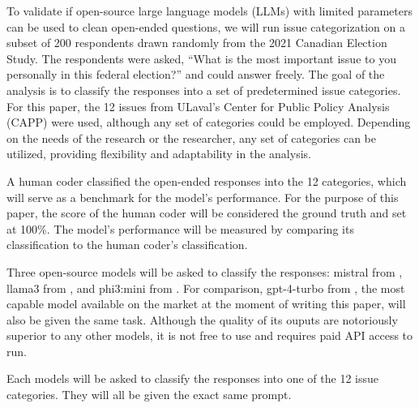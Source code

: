 \documentclass[
  authoryear,
  preprint,
  3p]{elsarticle}
\newenvironment{Shaded}{\begin{snugshade}}{\end{snugshade}}
\newcommand{\FunctionTok}[1]{\textcolor[rgb]{0.28,0.35,0.67}{#1}}
\newcommand{\NormalTok}[1]{\textcolor[rgb]{0.00,0.23,0.31}{#1}}
\newcommand{\OtherTok}[1]{\textcolor[rgb]{0.00,0.23,0.31}{#1}}
\newcommand{\SpecialCharTok}[1]{\textcolor[rgb]{0.37,0.37,0.37}{#1}}
\newcommand{\StringTok}[1]{\textcolor[rgb]{0.13,0.47,0.30}{#1}}
\begin{document}
To validate if open-source large language models (LLMs) with limited
parameters can be used to clean open-ended questions, we will run issue
categorization on a subset of 200 respondents drawn randomly from the
2021 Canadian Election Study. The respondents were asked, ``What is the
most important issue to you personally in this federal election?'' and
could answer freely. The goal of the analysis is to classify the
responses into a set of predetermined issue categories. For this paper,
the 12 issues from ULaval's Center for Public Policy Analysis (CAPP)
were used, although any set of categories could be employed. Depending
on the needs of the research or the researcher, any set of categories
can be utilized, providing flexibility and adaptability in the analysis.

A human coder classified the open-ended responses into the 12
categories, which will serve as a benchmark for the model's performance.
For the purpose of this paper, the score of the human coder will be
considered the ground truth and set at 100\%. The model's performance
will be measured by comparing its classification to the human coder's
classification.

Three open-source models will be asked to classify the responses:
mistral from \citet{jiang_etal23}, llama3 from \citet{meta24}, and
phi3:mini from \citet{abdin_etal24}. For comparison, gpt-4-turbo from
\citet{openai23b}, the most capable model available on the market at the
moment of writing this paper, will also be given the same task. Although
the quality of its ouputs are notoriously superior to any other models,
it is not free to use and requires paid API access to run.

Each models will be asked to classify the responses into one of the 12
issue categories. They will all be given the exact same prompt.

\begin{Shaded}
\end{Shaded}
\end{document}
